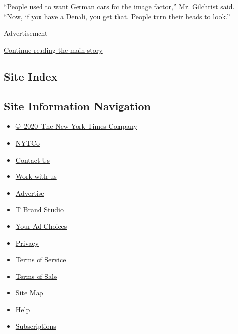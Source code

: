 ``People used to want German cars for the image factor,'' Mr. Gilchrist
said. ``Now, if you have a Denali, you get that. People turn their heads
to look.''

Advertisement

\protect\hyperlink{after-bottom}{Continue reading the main story}

\hypertarget{site-index}{%
\subsection{Site Index}\label{site-index}}

\hypertarget{site-information-navigation}{%
\subsection{Site Information
Navigation}\label{site-information-navigation}}

\begin{itemize}
\tightlist
\item
  \href{https://help.nytimes3xbfgragh.onion/hc/en-us/articles/115014792127-Copyright-notice}{©~2020~The
  New York Times Company}
\end{itemize}

\begin{itemize}
\tightlist
\item
  \href{https://www.nytco.com/}{NYTCo}
\item
  \href{https://help.nytimes3xbfgragh.onion/hc/en-us/articles/115015385887-Contact-Us}{Contact
  Us}
\item
  \href{https://www.nytco.com/careers/}{Work with us}
\item
  \href{https://nytmediakit.com/}{Advertise}
\item
  \href{http://www.tbrandstudio.com/}{T Brand Studio}
\item
  \href{https://www.nytimes3xbfgragh.onion/privacy/cookie-policy\#how-do-i-manage-trackers}{Your
  Ad Choices}
\item
  \href{https://www.nytimes3xbfgragh.onion/privacy}{Privacy}
\item
  \href{https://help.nytimes3xbfgragh.onion/hc/en-us/articles/115014893428-Terms-of-service}{Terms
  of Service}
\item
  \href{https://help.nytimes3xbfgragh.onion/hc/en-us/articles/115014893968-Terms-of-sale}{Terms
  of Sale}
\item
  \href{https://spiderbites.nytimes3xbfgragh.onion}{Site Map}
\item
  \href{https://help.nytimes3xbfgragh.onion/hc/en-us}{Help}
\item
  \href{https://www.nytimes3xbfgragh.onion/subscription?campaignId=37WXW}{Subscriptions}
\end{itemize}
